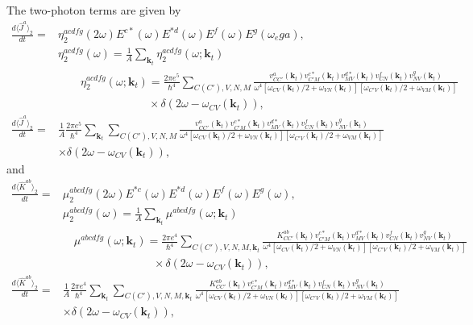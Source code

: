 \documentclass{article}
\begin{document}
The two-photon terms are given by 
\begin{align*}
    \frac{d \langle \hat{J}^{a} \rangle_{2}}{dt} = & \eta_{2}^{acdfg}(2\omega) E^{c*}(\omega) E^{*d}(\omega) E^{f}(\omega) E^{g}(\omega_ega),\\
    & \eta_{2}^{acdfg}(\omega) = \frac{1}{A} \sum_{\mathbf{k}_{t}} \eta^{acdfg}_{2}(\omega;\mathbf{k}_{t})\\
    & \qquad \eta^{acdfg}_{2}(\omega;\mathbf{k}_{t}) = \frac{2\pi e^{5}}{\hbar^{4}} \sum_{C(C'),V,N,M} \frac{v^{a}_{CC'}(\mathbf{k}_{t}) v^{c*}_{C'M}(\mathbf{k}_{t}) v^{d*}_{MV}(\mathbf{k}_{t}) v^{f}_{CN}(\mathbf{k}_{t}) v^{g}_{NV}(\mathbf{k}_{t}) }{\omega^{4}[\omega_{CV}(\mathbf{k}_{t})/2 + \omega_{VN}(\mathbf{k}_{t})] [\omega_{C'V}(\mathbf{k}_{t})/2 + \omega_{VM}(\mathbf{k}_{t})] } \\ & \qquad \qquad \qquad \qquad \times \delta(2\omega-\omega_{CV}(\mathbf{k}_{t})), \\
    \frac{d \langle \hat{J}^{a} \rangle_{2}}{dt} = & \frac{1}{A} \frac{2\pi e^{5}}{\hbar^{4}} \sum_{\mathbf{k}_{t}} \sum_{C(C'),V,N,M} \frac{v^{a}_{CC'}(\mathbf{k}_{t}) v^{c*}_{C'M}(\mathbf{k}_{t}) v^{d*}_{MV}(\mathbf{k}_{t}) v^{f}_{CN}(\mathbf{k}_{t}) v^{g}_{NV}(\mathbf{k}_{t}) }{\omega^{4}[\omega_{CV}(\mathbf{k}_{t})/2 + \omega_{VN}(\mathbf{k}_{t})] [\omega_{C'V}(\mathbf{k}_{t})/2 + \omega_{VM}(\mathbf{k}_{t})]} \\ & \times \delta(2\omega-\omega_{CV}(\mathbf{k}_{t})), 
\end{align*}
and
\begin{align*}
    \frac{d \langle \hat{K}^{ab} \rangle_{2}}{dt} = & \mu_{2}^{abcdfg}(2\omega) E^{*c}(\omega) E^{*d}(\omega) E^{f}(\omega) E^{g}(\omega), \\
    & \mu_{2}^{abcdfg}(\omega) = \frac{1}{A} \sum_{\mathbf{k}_{t}} \mu^{abcdfg}(\omega;\mathbf{k}_{t}) \\
    & \quad  \mu^{abcdfg}(\omega;\mathbf{k}_{t}) = \frac{2\pi e^{4}}{\hbar^{4}} \sum_{C(C'),V,N,M,\mathbf{k}_{t}} \frac{K^{ab}_{CC'}(\mathbf{k}_{t}) v^{c*}_{C'M}(\mathbf{k}_{t}) v^{d*}_{MV}(\mathbf{k}_{t}) v^{f}_{CN}(\mathbf{k}_{t}) v^{g}_{NV}(\mathbf{k}_{t}) }{\omega^{4}[\omega_{CV}(\mathbf{k}_{t})/2 + \omega_{VN}(\mathbf{k}_{t})] [\omega_{C'V}(\mathbf{k}_{t})/2 + \omega_{VM}(\mathbf{k}_{t})] } \\ & \qquad \qquad \qquad \qquad \times \delta(2\omega-\omega_{CV}(\mathbf{k}_{t})), \\
    \frac{d \langle \hat{K}^{ab} \rangle_{2}}{dt} = &  \frac{1}{A} \frac{2\pi e^{4}}{\hbar^{4}} \sum_{\mathbf{k}_{t}} \sum_{C(C'),V,N,M,\mathbf{k}_{t}} \frac{K^{ab}_{CC'}(\mathbf{k}_{t}) v^{c*}_{C'M}(\mathbf{k}_{t}) v^{d*}_{MV}(\mathbf{k}_{t}) v^{f}_{CN}(\mathbf{k}_{t}) v^{g}_{NV}(\mathbf{k}_{t}) }{\omega^{4}[\omega_{CV}(\mathbf{k}_{t})/2 + \omega_{VN}(\mathbf{k}_{t})] [\omega_{C'V}(\mathbf{k}_{t})/2 + \omega_{VM}(\mathbf{k}_{t})] } \\ & \times \delta(2\omega-\omega_{CV}(\mathbf{k}_{t})),
\end{align*}
\end{document}
